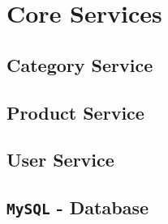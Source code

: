 \documentclass[11pt]{article}
\begin{document}
	\section{Core Services}
	\subsection{Category Service}
	\subsection{Product Service}
	\subsection{User Service}
	\subsection{\texttt{MySQL} - Database}
	
\end{document}
